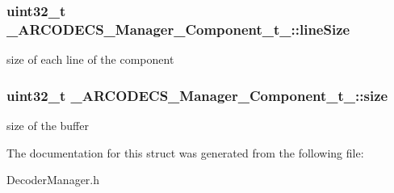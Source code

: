 \subsubsection[{line\+Size}]{\setlength{\rightskip}{0pt plus 5cm}uint32\+\_\+t \+\_\+\+A\+R\+C\+O\+D\+E\+C\+S\+\_\+\+Manager\+\_\+\+Component\+\_\+t\+\_\+\+::line\+Size}\label{struct__ARCODECS__Manager__Component__t___a69699f5b967723699ccb523484808ab9}
size of each line of the component \hypertarget{struct__ARCODECS__Manager__Component__t___a30b2f6ff9dd1fccb7053a092ccb0f107}{}
\subsubsection[{size}]{\setlength{\rightskip}{0pt plus 5cm}uint32\+\_\+t \+\_\+\+A\+R\+C\+O\+D\+E\+C\+S\+\_\+\+Manager\+\_\+\+Component\+\_\+t\+\_\+\+::size}\label{struct__ARCODECS__Manager__Component__t___a30b2f6ff9dd1fccb7053a092ccb0f107}
size of the buffer 

The documentation for this struct was generated from the following file\+:\begin{DoxyCompactItemize}
\item 
Decoder\+Manager.\+h\end{DoxyCompactItemize}

